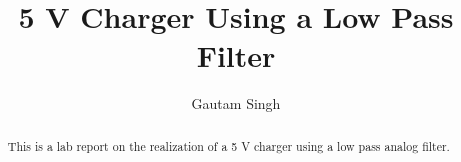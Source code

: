 \documentclass[journal,12pt,twocolumn]{IEEEtran}
\DeclareMathOperator*{\Res}{Res}
\begin{document}
\theoremstyle{definition}
\newtheorem{theorem}{Theorem}[section]
\newtheorem{problem}{Problem}
\newtheorem{proposition}{Proposition}[section]
\newtheorem{lemma}{Lemma}[section]
\newtheorem{corollary}[theorem]{Corollary}
\newtheorem{example}{Example}[section]
\newtheorem{definition}{Definition}[section]
\newcommand{\define}{\stackrel{\triangle}{=}}
\newcommand{\myvec}[1]{\ensuremath{\begin{pmatrix}#1\end{pmatrix}}}
\newcommand{\mydet}[1]{\ensuremath{\begin{vmatrix}#1\end{vmatrix}}}


\providecommand{\qfunc}[1]{\ensuremath{Q\left(#1\right)}}
\providecommand{\sbrak}[1]{\ensuremath{{}\left[#1\right]}}
\providecommand{\lsbrak}[1]{\ensuremath{{}\left[#1\right.}}
\providecommand{\rsbrak}[1]{\ensuremath{{}\left.#1\right]}}
\providecommand{\brak}[1]{\ensuremath{\left(#1\right)}}
\providecommand{\lbrak}[1]{\ensuremath{\left(#1\right.}}
\providecommand{\rbrak}[1]{\ensuremath{\left.#1\right)}}
\providecommand{\cbrak}[1]{\ensuremath{\left\{#1\right\}}}
\providecommand{\lcbrak}[1]{\ensuremath{\left\{#1\right.}}
\providecommand{\rcbrak}[1]{\ensuremath{\left.#1\right\}}}
\theoremstyle{remark}
\newtheorem{rem}{Remark}
\newcommand{\sgn}{\mathop{\mathrm{sgn}}}
\providecommand{\abs}[1]{\left\vert#1\right\vert}
\providecommand{\res}[1]{\Res\displaylimits_{#1}} 
\providecommand{\norm}[1]{\lVert#1\rVert}
\providecommand{\mtx}[1]{\mathbf{#1}}
\providecommand{\mean}[1]{E\left[ #1 \right]}
\providecommand{\fourier}{\overset{\mathcal{F}}{ \rightleftharpoons}}
\providecommand{\ztrans}{\overset{\mathcal{Z}}{ \rightleftharpoons}}
\providecommand{\diff}[2]{\ensuremath{\frac{d{#1}}{d{#2}}}}
\providecommand{\system}[1]{\overset{\mathcal{#1}}{\longleftrightarrow}}
\newcommand{\solution}{\noindent \textbf{Solution: }}
\renewcommand{\thefigure}{\arabic{section}.\arabic{figure}}
\makeatletter
{}
\makeatother

\vspace{3cm}
\title{5 V Charger Using a Low Pass Filter}
\author{Gautam Singh}
\maketitle
\tableofcontents
\renewcommand{\thetable}{\theenumi}
\bigskip

\begin{abstract}
    This is a lab report on the realization of a 5 V charger using
    a low pass analog filter.
\end{abstract}
\end{document}
